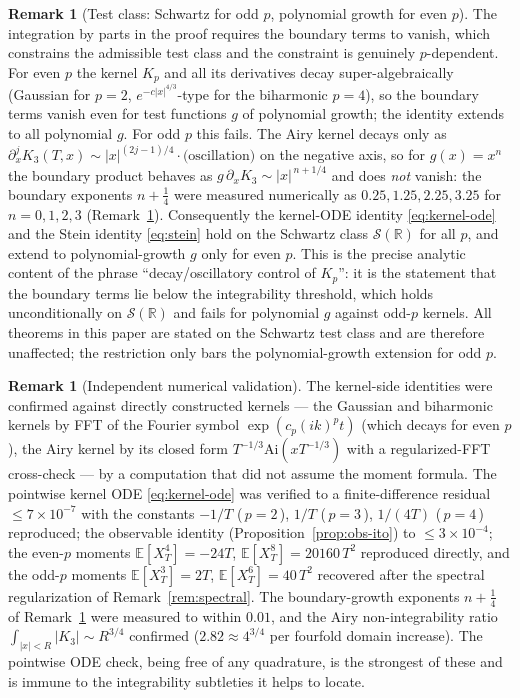 \documentclass[11pt,reqno]{amsart}
\theoremstyle{plain}
\theoremstyle{definition}
\newtheorem{remark}[theorem]{Remark}
\newcommand{\E}{\mathbb{E}}
\newcommand{\R}{\mathbb{R}}
\newcommand{\Schw}{\mathcal{S}}
\begin{document}
\begin{remark}[Test class: Schwartz for odd $p$, polynomial growth for even $p$]
\label{rem:test-class}
The integration by parts in the proof requires the boundary terms to vanish, which constrains the admissible test class and the constraint is genuinely $p$-dependent. For even $p$ the kernel $K_p$ and all its derivatives decay super-algebraically (Gaussian for $p=2$, $e^{-c|x|^{4/3}}$-type for the biharmonic $p=4$), so the boundary terms vanish even for test functions $g$ of polynomial growth; the identity extends to all polynomial $g$. For odd $p$ this fails. The Airy kernel decays only as $\partial_x^j K_3(T,x) \sim |x|^{(2j-1)/4}\cdot\text{(oscillation)}$ on the negative axis, so for $g(x) = x^n$ the boundary product behaves as $g\,\partial_x K_3 \sim |x|^{\,n+1/4}$ and does \emph{not} vanish: the boundary exponents $n+\tfrac14$ were measured numerically as $0.25, 1.25, 2.25, 3.25$ for $n=0,1,2,3$ (Remark~\ref{rem:numerics}). Consequently the kernel-ODE identity \eqref{eq:kernel-ode} and the Stein identity \eqref{eq:stein} hold on the Schwartz class $\Schw(\R)$ for all $p$, and extend to polynomial-growth $g$ only for even $p$. This is the precise analytic content of the phrase ``decay/oscillatory control of $K_p$'': it is the statement that the boundary terms lie below the integrability threshold, which holds unconditionally on $\Schw(\R)$ and fails for polynomial $g$ against odd-$p$ kernels. All theorems in this paper are stated on the Schwartz test class and are therefore unaffected; the restriction only bars the polynomial-growth extension for odd $p$.
\end{remark}

\begin{remark}[Independent numerical validation]
\label{rem:numerics}
The kernel-side identities were confirmed against directly constructed kernels --- the Gaussian and biharmonic kernels by FFT of the Fourier symbol $\exp(c_p(ik)^p t)$ (which decays for even $p$), the Airy kernel by its closed form $T^{-1/3}\mathrm{Ai}(x T^{-1/3})$ with a regularized-FFT cross-check --- by a computation that did not assume the moment formula. The pointwise kernel ODE \eqref{eq:kernel-ode} was verified to a finite-difference residual $\leq 7\times10^{-7}$ with the constants $-1/T$ (\,$p{=}2$\,), $1/T$ (\,$p{=}3$\,), $1/(4T)$ (\,$p{=}4$\,) reproduced; the observable identity (Proposition~\ref{prop:obs-ito}) to $\leq 3\times10^{-4}$; the even-$p$ moments $\E[X_T^4]=-24T$, $\E[X_T^8]=20160\,T^2$ reproduced directly, and the odd-$p$ moments $\E[X_T^3]=2T$, $\E[X_T^6]=40\,T^2$ recovered after the spectral regularization of Remark~\ref{rem:spectral}. The boundary-growth exponents $n+\tfrac14$ of Remark~\ref{rem:test-class} were measured to within $0.01$, and the Airy non-integrability ratio $\int_{|x|<R}|K_3| \sim R^{3/4}$ confirmed ($2.82 \approx 4^{3/4}$ per fourfold domain increase). The pointwise ODE check, being free of any quadrature, is the strongest of these and is immune to the integrability subtleties it helps to locate.
\end{remark}
\end{document}
